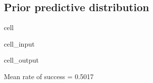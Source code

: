 \documentclass[letterpaper,10pt,english]{jupyterBook}
\begin{document}
\subsection{Prior predictive distribution}
\label{\detokenize{Lecture 3:prior-predictive-distribution}}
\begin{sphinxuseclass}{cell}\begin{sphinxVerbatimInput}

\begin{sphinxuseclass}{cell_input}
\begin{sphinxVerbatim}[commandchars=\\\{\}]

\end{sphinxVerbatim}

\end{sphinxuseclass}\end{sphinxVerbatimInput}
\begin{sphinxVerbatimOutput}

\begin{sphinxuseclass}{cell_output}
\begin{sphinxVerbatim}[commandchars=\\\{\}]
Mean rate of success = 0.5017
\end{sphinxVerbatim}

\end{sphinxuseclass}\end{sphinxVerbatimOutput}

\end{sphinxuseclass}
\end{document}
